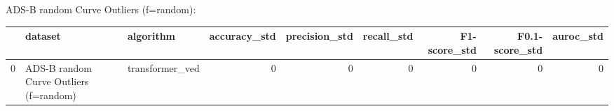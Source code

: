 ADS-B random Curve Outliers (f=random):

\begin{tabular}{rllrrrrrr}
\hline
    & dataset                                & algorithm       &   accuracy\_std &   precision\_std &   recall\_std &   F1-score\_std &   F0.1-score\_std &   auroc\_std \\
\hline
  0 & ADS-B random Curve Outliers (f=random) & transformer\_ved &              0 &               0 &            0 &              0 &                0 &           0 \\
\hline
\end{tabular}

